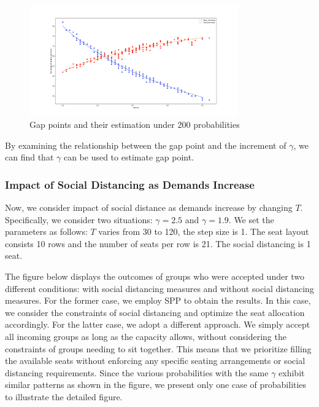 \begin{figure}[ht]
  \centering
    \includegraphics[width=0.8\textwidth]{./Figures/gamma_estimation.pdf}
  \caption{Gap points and their estimation under 200 probabilities}
\end{figure}

By examining the relationship between the gap point and the increment of $\gamma$, we can find that $\gamma$ can be used to estimate gap point.

\subsubsection{Impact of Social Distancing as Demands Increase}
Now, we consider impact of social distance as demands increase by changing $T$. Specifically, we consider two situations: $\gamma = 2.5$ and $\gamma = 1.9$. We set the parameters as follows: $T$ varies from 30 to 120, the step size is 1.  The seat layout consists 10 rows and the number of seats per row is 21. The social distancing is 1 seat.

The figure below displays the outcomes of groups who were accepted under two different conditions: with social distancing measures and without social distancing measures. For the former case, we employ SPP to obtain the results. In this case, we consider the constraints of social distancing and optimize the seat allocation accordingly. For the latter case, we adopt a different approach. We simply accept all incoming groups as long as the capacity allows, without considering the constraints of groups needing to sit together. This means that we prioritize filling the available seats without enforcing any specific seating arrangements or social distancing requirements. Since the various probabilities with the same $\gamma$ exhibit similar patterns as shown in the figure, we present only one case of probabilities to illustrate the detailed figure.

